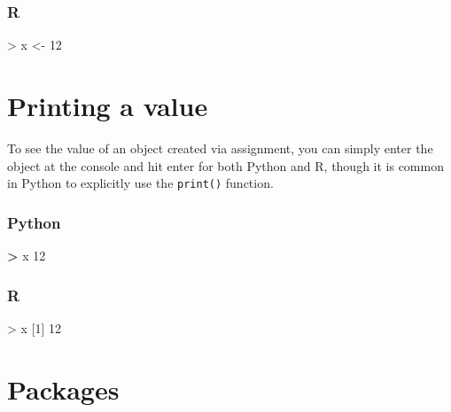 \documentclass[
]{book}
\newenvironment{Shaded}{\begin{snugshade}}{\end{snugshade}}
\newcommand{\DecValTok}[1]{\textcolor[rgb]{0.00,0.00,0.81}{#1}}
\newcommand{\NormalTok}[1]{#1}
\newcommand{\OperatorTok}[1]{\textcolor[rgb]{0.81,0.36,0.00}{\textbf{#1}}}
\newcommand{\OtherTok}[1]{\textcolor[rgb]{0.56,0.35,0.01}{#1}}
\newcommand{\SpecialCharTok}[1]{\textcolor[rgb]{0.00,0.00,0.00}{#1}}
\begin{document}
\hypertarget{r-1}{%
\subsubsection*{R}\label{r-1}}

\begin{Shaded}
\begin{Highlighting}[]
\SpecialCharTok{\textgreater{}}\NormalTok{ x }\OtherTok{\textless{}{-}} \DecValTok{12}
\end{Highlighting}
\end{Shaded}

\hypertarget{printing-a-value}{%
\section{Printing a value}\label{printing-a-value}}

To see the value of an object created via assignment, you can simply enter the object at the console and hit enter for both Python and R, though it is common in Python to explicitly use the \texttt{print()} function.

\hypertarget{python-2}{%
\subsubsection*{Python}\label{python-2}}

\begin{Shaded}
\begin{Highlighting}[]
\OperatorTok{\textgreater{}}\NormalTok{ x}
\DecValTok{12}
\end{Highlighting}
\end{Shaded}

\hypertarget{r-2}{%
\subsubsection*{R}\label{r-2}}

\begin{Shaded}
\begin{Highlighting}[]
\SpecialCharTok{\textgreater{}}\NormalTok{ x}
\NormalTok{[}\DecValTok{1}\NormalTok{] }\DecValTok{12}
\end{Highlighting}
\end{Shaded}

\hypertarget{packages}{%
\section{Packages}\label{packages}}
\end{document}
